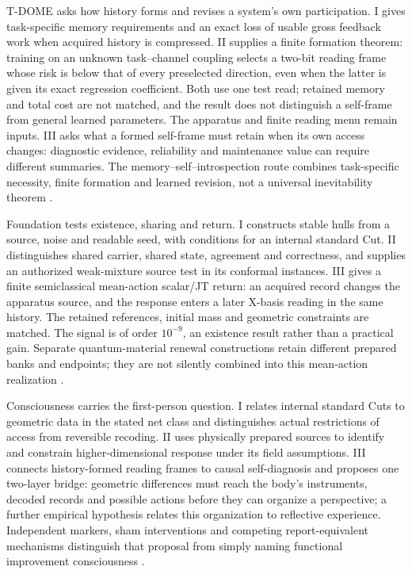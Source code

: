 \documentclass[12pt,a4paper]{article}
\begin{document}
T-DOME asks how history forms and revises a system's own participation. I gives task-specific memory requirements and an exact loss of usable gross feedback work when acquired history is compressed. II supplies a finite formation theorem: training on an unknown task--channel coupling selects a two-bit reading frame whose risk is below that of every preselected direction, even when the latter is given its exact regression coefficient. Both use one test read; retained memory and total cost are not matched, and the result does not distinguish a self-frame from general learned parameters. The apparatus and finite reading menu remain inputs. III asks what a formed self-frame must retain when its own access changes: diagnostic evidence, reliability and maintenance value can require different summaries. The memory--self--introspection route combines task-specific necessity, finite formation and learned revision, not a universal inevitability theorem \cite{TDOME}.

Foundation tests existence, sharing and return. I constructs stable hulls from a source, noise and readable seed, with conditions for an internal standard Cut. II distinguishes shared carrier, shared state, agreement and correctness, and supplies an authorized weak-mixture source test in its conformal instances. III gives a finite semiclassical mean-action scalar/JT return: an acquired record changes the apparatus source, and the response enters a later X-basis reading in the same history. The retained references, initial mass and geometric constraints are matched. The signal is of order $10^{-9}$, an existence result rather than a practical gain. Separate quantum-material renewal constructions retain different prepared banks and endpoints; they are not silently combined into this mean-action realization \cite{Foundation,QRAIF}.

Consciousness carries the first-person question. I relates internal standard Cuts to geometric data in the stated net class and distinguishes actual restrictions of access from reversible recoding. II uses physically prepared sources to identify and constrain higher-dimensional response under its field assumptions. III connects history-formed reading frames to causal self-diagnosis and proposes one two-layer bridge: geometric differences must reach the body's instruments, decoded records and possible actions before they can organize a perspective; a further empirical hypothesis relates this organization to reflective experience. Independent markers, sham interventions and competing report-equivalent mechanisms distinguish that proposal from simply naming functional improvement consciousness \cite{Consciousness}.
\end{document}
